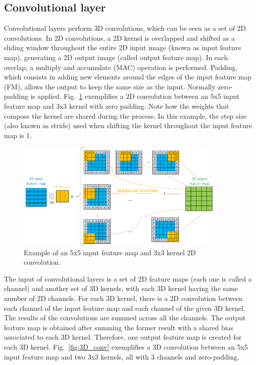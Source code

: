 \subsection{Convolutional layer}

Convolutional layers perform 3D convolutions, which can be seen as a set of 2D convolutions. In 2D convolutions, a 2D kernel is overlapped and shifted as a sliding window throughout the entire 2D input image (known as input feature map), generating a 2D output image (called output feature map). In each overlap, a multiply and accumulate (MAC) operation is performed. Padding, which consists in adding new elements around the edges of the input feature map (FM), allows the output to keep the same size as the input. Normally zero-padding is applied. Fig.~\ref{fig:2D_conv} exemplifies a 2D convolution between an 5x5 input feature map and 3x3 kernel with zero padding. Note how the weights that compose the kernel are shared during the process. In this example, the step size (also known as stride) used when shifting the kernel throughout the input feature map is 1.   

\begin{figure}[!htb]
  \centering
  \includegraphics[width=0.9\textwidth]{Figures/2D_conv.png}
  \caption{Example of an 5x5 input feature map and 3x3 kernel 2D convolution.}
  \label{fig:2D_conv}
\end{figure}

The input of convolutional layers is a set of 2D feature maps (each one is called a channel) and another set of 3D kernels, with each 3D kernel having the same number of 2D channels. For each 3D kernel, there is a 2D convolution between each channel of the input feature map and each channel of the given 3D kernel. The results of the convolutions are summed across all the channels. The output feature map is obtained after summing the former result with a shared bias associated to each 3D kernel. Therefore, one output feature map is created for each 3D kernel. Fig.~\ref{fig:3D_conv} exemplifies a 3D convolution between an 5x5 input feature map and two 3x3 kernels, all with 3 channels and zero-padding.

